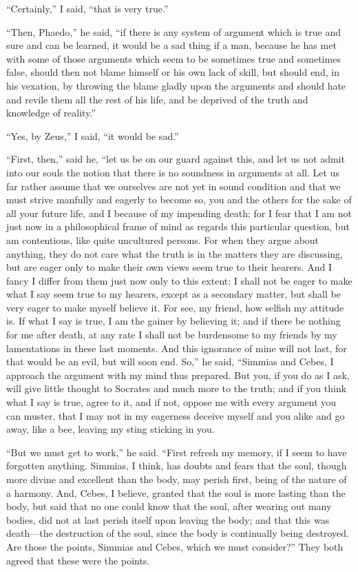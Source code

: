 \documentclass[letterpaper,12pt]{article}
\newcommand{\stephpag}[1]{\marginnote{\small\itshape\fontfamily{ppl}\selectfont #1}}
\begin{document}
\begin{drama}
``Certainly,'' I said, ``that is very true.''
 
``Then, Phaedo,'' he said, ``if there is any system of argument which is true and sure and can be learned, it would be a sad thing if a man, \stephpag{d} because he has met with some of those arguments which seem to be sometimes true and sometimes false, should then not blame himself or his own lack of skill, but should end, in his vexation, by throwing the blame gladly upon the arguments and should hate and revile them all the rest of his life, and be deprived of the truth and knowledge of reality.''
 
``Yes, by Zeus,'' I said, ``it would be sad.''
 
``First, then,'' said he, ``let us be on our guard against this, \stephpag{e} and let us not admit into our souls the notion that there is no soundness in arguments at all. Let us far rather assume that we ourselves are not yet in sound condition and that we must strive manfully and eagerly to become so, you and the others for the sake of all your future life, \stephpag{91 a} and I because of my impending death; for I fear that I am not just now in a philosophical frame of mind as regards this particular question, but am contentious, like quite uncultured persons. For when they argue about anything, they do not care what the truth is in the matters they are discussing, but are eager only to make their own views seem true to their hearers. And I fancy I differ from them just now only to this extent: I shall not be eager to make what I say seem true to my hearers, except as a secondary matter, but shall be very eager \stephpag{b} to make myself believe it. For see, my friend, how selfish my attitude is. If what I say is true, I am the gainer by believing it; and if there be nothing for me after death, at any rate I shall not be burdensome to my friends by my lamentations in these last moments. And this ignorance of mine will not last, for that would be an evil, but will soon end. So,'' he said, ``Simmias and Cebes, I approach the argument with my mind thus prepared. But you, \stephpag{c} if you do as I ask, will give little thought to Socrates and much more to the truth; and if you think what I say is true, agree to it, and if not, oppose me with every argument you can muster, that I may not in my eagerness deceive myself and you alike and go away, like a bee, leaving my sting sticking in you.
 
``But we must get to work,'' he said. ``First refresh my memory, if I seem to have forgotten anything. Simmias, I think, has doubts and fears that the soul, though more divine and \stephpag{d} excellent than the body, may perish first, being of the nature of a harmony. And, Cebes, I believe, granted that the soul is more lasting than the body, but said that no one could know that the soul, after wearing out many bodies, did not at last perish itself upon leaving the body; and that this was death---the destruction of the soul, since the body is continually being destroyed. Are those the points, Simmias and Cebes, which we must consider?'' \stephpag{e} They both agreed that these were the points.
 

\end{drama}
\end{document}
